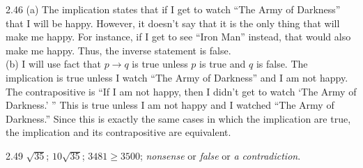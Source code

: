\begin{Answer}{2.46}
(a)
The implication states that if I get to watch ``The Army of Darkness'' that I will be happy.  However,
it doesn't say that it is the only thing that will make me happy.
For instance, if I get to see ``Iron Man'' instead, that would also make me happy.
Thus, the inverse statement is false.\\
(b)
I will use fact that $p\rightarrow q$ is true unless $p$ is true and $q$ is false.
The implication is true unless I watch ``The Army of Darkness'' and I am not happy.
The contrapositive is ``If I am not happy, then I didn't get to watch `The Army of Darkness.' ''
This is true unless I am not happy and I watched ``The Army of Darkness.''
Since this is exactly the same cases in which the implication are true, the implication
and its contrapositive are equivalent.
\end{Answer}
\begin{Answer}{2.49}
$ \sqrt{35}$; $10\sqrt{35}$; $3481 \geq 3500$; {\em nonsense} or {\em false} or {\em a contradiction}.
\end{Answer}
